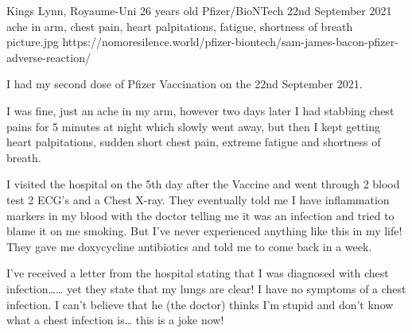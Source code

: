           {Kings Lynn, Royaume-Uni}
          {26 years old}
          {Pfizer/BioNTech}
          {22nd September 2021}
          {ache in arm, chest pain, heart palpitations, fatigue, shortness of breath}
          {picture.jpg}
          {https://nomoresilence.world/pfizer-biontech/sam-james-bacon-pfizer-adverse-reaction/}
          {

I had my second dose of Pfizer Vaccination on the 22nd September 2021.

I was fine, just an ache in my arm, however two days later I had stabbing chest
pains for 5 minutes at night which slowly went away, but then I kept getting
heart palpitations, sudden short chest pain, extreme fatigue and shortness of
breath.

I visited the hospital on the 5th day after the Vaccine and went through 2 blood
test 2 ECG’s and a Chest X-ray. They eventually told me I have inflammation
markers in my blood with the doctor telling me it was an infection and tried to
blame it on me smoking. But I’ve never experienced anything like this in my
life! They gave me doxycycline antibiotics and told me to come back in a week.

I’ve received a letter from the hospital stating that I was diagnosed with chest
infection…… yet they state that my lungs are clear! I have no symptoms of a
chest infection. I can’t believe that he (the doctor) thinks I’m stupid and
don’t know what a chest infection is… this is a joke now!

}
